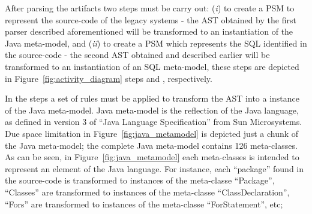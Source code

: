 \documentclass[a4paper,twoside]{article}
\newcommand*\circled[1]{\tikz[baseline=(char.base)]{
  \node[shape=circle,draw, inner sep=0.1pt] (char) {#1};}
}
\begin{document}











After parsing the artifacts two steps must be carry out: (\textit{i}) to create a PSM to represent the source-code of the legacy systems - the AST obtained by the first parser described aforementioned will be transformed to an instantiation of the Java meta-model, and (\textit{ii}) to create a PSM which represents the SQL identified in the source-code - the second AST obtained and described earlier will be transformed to an instantiation of an SQL meta-model, these steps are depicted in Figure~\ref{fig:activity_diagram} steps \circled{\textbf{C}} and \circled{\textbf{D}}, respectively.




In the steps \circled{\textbf{C}} a set of rules must be applied to transform the AST into a instance of the Java meta-model. 
 Java meta-model is the reflection of the Java language, as defined in version 3 of ``Java Language Specification'' from Sun Microsystems. Due space limitation in Figure~\ref{fig:java_metamodel} is depicted just a chunk of the Java meta-model; the complete Java meta-model contains 126 meta-classes. As can be seen, in Figure~\ref{fig:java_metamodel} each meta-classes is intended to represent an element of the Java language. For instance, each ``package'' found in the source-code is transformed to instances of the meta-classe ``Package'', ``Classes'' are transformed to instances of the meta-classe ``ClassDeclaration'', ``Fors'' are transformed to instances of the meta-classe ``ForStatement'', etc;
\end{document}
